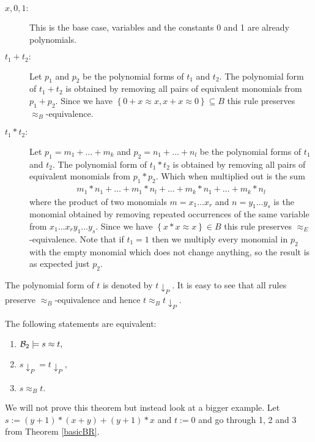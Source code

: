 	\begin{description}
		\item[$x,0,1:$] This is the base case, variables and the constants 0 and 1 are already polynomials.
		\item[$t_1+t_2:$] Let $p_1$ and $p_2$ be the polynomial forms of $t_1$ and $t_2$. The polynomial form of $t_1+t_2$ is obtained by removing all pairs of equivalent monomials from $p_1+p_2$. Since we have $\left\lbrace0+x\approx x,x+x\approx0\right\rbrace\subseteq B$  this rule preserves $\approx_B$-equivalence.
		\item[$t_1*t_2:$]  Let $p_1=m_1+\dots+m_k$ and $p_2=n_1+\dots+n_l$ be the polynomial forms of $t_1$ and $t_2$. The polynomial form of $t_1*t_2$ is obtained by removing all pairs of equivalent monomials from $p_1*p_2$. Which when multiplied out is the sum
		\begin{align*}
			m_1*n_1+\dots+m_1*n_l+\dots+m_k*n_1+\dots+m_k*n_l 
		\end{align*} 
		where the product of two monomials $m=x_1\dots x_r$ and $n=y_1\dots y_s$ is the monomial obtained by removing repeated occurrences of the same variable from $x_1\dots x_r y_1\dots y_s$. Since we have $\left\lbrace x*x\approx x\right\rbrace\in B$  this rule preserves $\approx_E$-equivalence. Note that if $t_1=1$ then we multiply every monomial in $p_2$ with the empty monomial which does not change anything, so the result is as expected just $p_2$.
	\end{description}
	The polynomial form of $t$ is denoted by $t{\downarrow_P}$. It is easy to see that all rules preserve $\approx_B$-equivalence and hence $t\approx_Bt{\downarrow_P}$.
	\begin{theorem}\label{basicBR}
		The following statements are equivalent:
		\begin{enumerate}
			\item ${\mathcal{B}_2}\models s\approx t,$
			\item $s{\downarrow_P}=t{\downarrow_P},$
			\item $s\approx_B t.$
		\end{enumerate}
	\end{theorem}
	We will not prove this theorem but instead look at a bigger example. Let $s:=(y+1)*(x+y)+(y+1)*x$ and $t:=0$ and go through 1, 2 and 3 from Theorem \ref{basicBR}.
